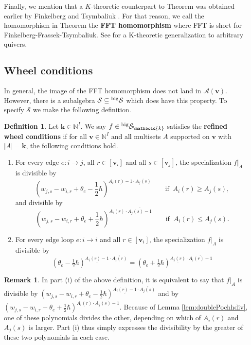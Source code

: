 \documentclass[11pt,reqno]{amsart}
\renewcommand{\mathbf}{\mathbold}
\numberwithin{equation}{section}
\theoremstyle{definition}
\newtheorem{Remark}[equation]{Remark}
\newtheorem{Definition}[equation]{Definition}
\newcommand{\cA}{\mathcal{A}}
\newcommand{\cS}{\mathcal{S}}
\newcommand{\bk}{\mathbf{k}}
\newcommand{\bv}{\mathbf{v}}
\newcommand{\NN}{\mathbb{N}}
\newcommand{\leftexp}[2]{\vphantom{#2}^{#1} #2}
\renewcommand{\bv}{\mathbf{v}} %
\newcommand{\qzast}{\cA}
\newcommand{\preshu}{\leftexp{\mathrm{big}}{\cS}}
\begin{document}
Finally, we mention that a $K$-theoretic counterpart to Theorem  was obtained earlier by Finkelberg and Tsymbaliuk \cite[\S 4]{FT2}. For that reason, we call the homomorphism in Theorem  the {\bf FFT homomorphism} where FFT is short for Finkelberg-Frassek-Tsymbaliuk.  See \cite[Theorem 4.1]{JN26} for a K-theoretic generalization to arbitrary quivers.



\subsection{Wheel conditions}
\label{ssec:wheel-conditions}

In general, the image of the FFT homomorphism does not land in $\qzast(\bv)$. However, there is a subalgebra $\cS \subseteq \preshu$ which does have this property. To specify $\cS$ we make the following definition.

\begin{Definition}
\label{def:refined-wheel-conditions}
Let $\bk \in \NN^I$. We say $f \in \preshu_\bk$ satisfies the {\bf refined wheel conditions} if for all $\bv \in \NN^I$ and all multisets $A$ supported on $\bv$ with $|A| = \bk$, the following conditions hold.

\begin{enumerate}[label=(\roman*)]
\item For every edge $e : i \rightarrow j$, all $r \in [\bv_i]$ and all $s\in [\bv_j]$, the specialization $f|_A$ is divisible by
$$
(w_{j,s} - w_{i,r} + \theta_e - \frac{1}{2}\hbar)^{\underline{A_i(r) - 1} \cdot \overline{A_j(s)}} \qquad \text{if } \ A_i(r) \geq A_j(s),
$$
and divisible by 
$$
(w_{j,s} - w_{i,r} + \theta_e + \frac{1}{2}\hbar)^{\underline{A_i(r)} \cdot \overline{A_j(s) - 1}} \qquad \text{if } \  A_i(r) \leq A_j(s).
$$

\item For every edge loop $e : i \rightarrow i$ and all $r \in [\bv_i]$, the specialization $f|_A$ is divisible by
$$
(\theta_e - \tfrac{1}{2}\hbar)^{\underline{A_i(r)-1} \cdot \overline{A_i(r)}} =
(\theta_e + \tfrac{1}{2}\hbar)^{\underline{A_i(r)} \cdot \overline{A_i(r)-1}}
$$
\end{enumerate}
\end{Definition}


\begin{Remark}
    In part (i) of the above definition, it is equivalent to say that $f|_A$ is divisible by ${(w_{j,s} - w_{i,r} + \theta_e - \frac{1}{2}\hbar)^{\underline{A_i(r) - 1} \cdot \overline{A_j(s)}}}$ and by $(w_{j,s} - w_{i,r} + \theta_e + \frac{1}{2}\hbar)^{\underline{A_i(r)} \cdot \overline{A_j(s) - 1}}$. Because of Lemma \ref{lem:doublePochhdiv}, one of these polynomials divides the other, depending on which of $A_i(r)$ and $A_j(s)$ is larger.  Part (i) thus simply expresses the divisibility by the greater of these two polynomials in each case.
\end{Remark}
\end{document}
